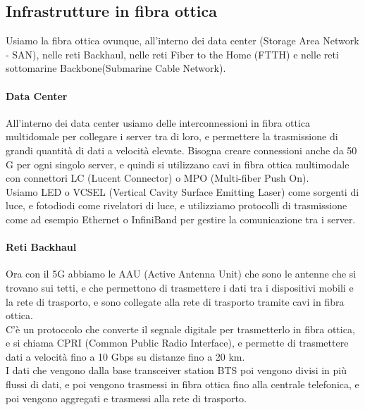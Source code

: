 \subsection{Infrastrutture in fibra ottica}
Usiamo la fibra ottica ovunque, all'interno dei data center (Storage Area Network - SAN), nelle reti Backhaul, nelle reti Fiber to the Home (FTTH) e nelle reti sottomarine Backbone(Submarine Cable Network).\\

\paragraph{Data Center}

All'interno dei data center usiamo delle interconnessioni in fibra ottica multidomale per collegare i server tra di loro, e permettere la trasmissione di grandi quantità di dati a velocità elevate.
Bisogna creare connessioni anche da 50 G per ogni singolo server, e quindi si utilizzano cavi in fibra ottica multimodale con connettori LC (Lucent Connector) o MPO (Multi-fiber Push On).\\
Usiamo LED o VCSEL (Vertical Cavity Surface Emitting Laser) come sorgenti di luce, e fotodiodi come rivelatori di luce, e utilizziamo protocolli di trasmissione come ad esempio Ethernet o InfiniBand per gestire la comunicazione tra i server.\\

\paragraph{Reti Backhaul}
Ora con il 5G abbiamo le AAU (Active Antenna Unit) che sono le antenne che si trovano sui tetti, e che permettono di trasmettere i dati tra i dispositivi mobili e la rete di trasporto, 
e sono collegate alla rete di trasporto tramite cavi in fibra ottica.\\

C'è un protoccolo che converte il segnale digitale per trasmetterlo in fibra ottica, e si chiama CPRI (Common Public Radio Interface), e permette di trasmettere dati a velocità fino a 10 Gbps su distanze fino a 20 km.\\

I dati che vengono dalla base transceiver station BTS poi vengono divisi in più flussi di dati, e poi vengono trasmessi in fibra ottica fino alla centrale telefonica, e poi vengono aggregati e trasmessi alla rete di trasporto.\\

